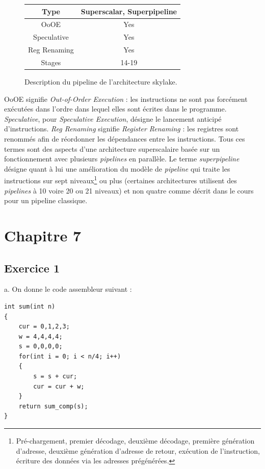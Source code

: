 \documentclass[11pt, a4 paper]{article}
\begin{document}
\begin{figure}[!h]
    \centering
    \begin{tabular}{|c|c|}
        \hline
        Type & Superscalar, Superpipeline\\
        \hline
        OoOE & Yes\\
        \hline
        Speculative	& Yes\\
        \hline
        Reg Renaming & Yes\\
        \hline
        Stages & 14-19\\
        \hline
    \end{tabular}
    \caption{Description du pipeline de l'architecture skylake.}
\end{figure}

OoOE signifie \textit{Out-of-Order Execution} : les instructions ne sont pas forcément exécutées dans l'ordre dans lequel elles sont écrites dans le programme.
\textit{Speculative}, pour \textit{Speculative Execution}, désigne le lancement anticipé d'instructions.
\textit{Reg Renaming} signifie \textit{Register Renaming} : les registres sont renommés afin de réordonner les dépendances entre les instructions. Tous ces termes sont des aspects d'une architecture superscalaire basée sur un fonctionnement avec plusieurs \textit{pipelines} en parallèle.
Le terme \textit{superpipeline} désigne quant à lui une amélioration du modèle de \textit{pipeline} qui traite les instructions sur sept niveaux\footnote{Pré-chargement, premier décodage, deuxième décodage, première génération d'adresse, deuxième génération d'adresse de retour, exécution de l'instruction, écriture des données via les adresses prégénérées.} ou plus (certaines architectures utilisent des \textit{pipelines} à 10 voire 20 ou 21 niveaux) et non quatre comme décrit dans le cours pour un pipeline classique.

\section{Chapitre 7}

\subsection{Exercice 1}
a. On donne le code assembleur suivant :
\begin{lstlisting}[style=CStyle]
int sum(int n)
{
    cur = 0,1,2,3;
    w = 4,4,4,4;
    s = 0,0,0,0;
    for(int i = 0; i < n/4; i++)
    {
        s = s + cur;
        cur = cur + w;
    }
    return sum_comp(s);
}
\end{lstlisting}
\end{document}

